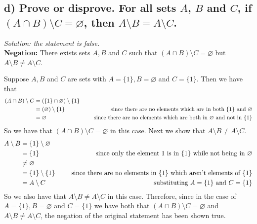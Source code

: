 \documentclass[11pt, letterpaper]{article}
\begin{document}
\subsection*{d) Prove or disprove.  For all sets $A$, $B$ and $C$, if $(A\cap B)\setminus C=\varnothing$, then $A\setminus B=A\setminus C$. }
{\large\it Solution: the statement is false.}\\[0.25cm]
{\bf Negation:} There exists sets $A, B$ and $C$ such that $(A\cap B)\setminus C=\varnothing$ but $A\setminus B\neq A\setminus C$.
\begin{prf}
    Suppose $A, B$ and $C$ are sets with $A=\{1\}, B=\varnothing$ and $C=\{1\}$. Then we have that
    \begin{align*}
        (A\cap B)\setminus C &= (\{1\}\cap \varnothing)\setminus \{1\} \\
        &= (\varnothing)\setminus \{1\} &\text{\indent since there are no elements which are in both $\{1\}$ and $\varnothing$}\\
        &= \varnothing &\text{\indent since there are no elements which are both in $\varnothing$ and not in $\{1\}$}
    \end{align*}
    So we have that $(A\cap B)\setminus C=\varnothing$ in this case. Next we show that $A\setminus B\neq A\setminus C$.
    \begin{align*}
        A\setminus B &= \{1\}\setminus \varnothing\\
        &= \{1\} &\text{\indent since only the element $1$ is in \{1\} while not being in $\varnothing$}\\
        &\neq \varnothing\\
        &= \{1\}\setminus \{1\} &\text{\indent since there are no elements in $\{1\}$ which aren't elements of $\{1\}$}\\
        &= A\setminus C &\text{\indent substituting $A=\{1\}$ and $C=\{1\}$}
    \end{align*}
    So we also have that $A\setminus B\neq A\setminus C$ in this case. Therefore, since in the case of $A=\{1\}, B=\varnothing$ and $C=\{1\}$ we have both that $(A\cap B)\setminus C=\varnothing$ and $A\setminus B\neq A\setminus C$, the negation of the original statement has been shown true.
\end{prf}
\end{document}
